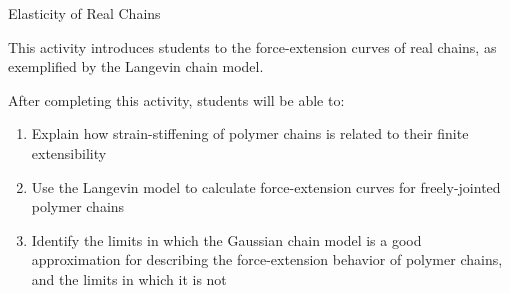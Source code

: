 %
%
%
%

\renewcommand{\figpath}{content/polymphys/chain-confs/langevin-chains/figs}
\renewcommand{\labelbase}{langevin-chains}

\begin{activity}[extension]{Elasticity of Real Chains}
\label{\labelbase}

\begin{instructornotes}

	This activity introduces students to the force-extension curves of real chains, as exemplified by the Langevin chain model.
	
	After completing this activity, students will be able to:
			\begin{enumerate}
				\item Explain how strain-stiffening of polymer chains is related to their finite extensibility
				\item Use the Langevin model to calculate force-extension curves for freely-jointed polymer chains
				\item Identify the limits in which the Gaussian chain model is a good approximation for describing the force-extension behavior of polymer chains, and the limits in which it is not
			\end{enumerate}
	
			

\end{instructornotes}
\end{activity}
